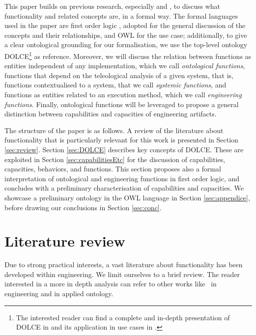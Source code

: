 \documentclass[sw]{iosart2x}
\newcommand{\DOLCE}{\textsc{DOLCE}\xspace} %
\newcommand{\OWL}{\textnormal{OWL}\xspace}
\newcommand{\firstTimeKeyWord}[1]{\textit{#1}}
\begin{document}
This paper builds on previous research, especially \cite{borgoCapabilitiesCapacitiesFunctionalities2021} and \cite{mizoguchiUnifyingDefinitionArtifact2016}, to discuss what functionality and related concepts are, in a formal way. 
The formal languages used in the paper are first order logic \cite{sep-logic-classical}, adopted for the general discussion of the concepts and their relationships, and \OWL \cite{OWL2-QUICK-REFERENCE} for the use case; additionally, to give a clear ontological grounding for our formalisation, we use the top-level ontology \DOLCE\footnote{The interested reader can find a complete and in-depth presentation of \DOLCE in \cite{masoloWonderWebDeliverableD182003} and its application in use cases in \cite{borgoDOLCEDescriptiveOntology2022}.} as reference. 
Moreover, we will discuss the relation between functions as entities independent of any implementation, which we call \firstTimeKeyWord{ontological functions}, functions that depend on the teleological analysis of a given system, that is, functions contextualised to a system, that we call \firstTimeKeyWord{systemic functions}, and functions as entities related to an execution method, which we call \firstTimeKeyWord{engineering functions}.
Finally, ontological functions will be leveraged to propose a general distinction between capabilities and capacities of engineering artifacts.   

The structure of the paper is as follows. A review of the literature about functionality that is particularly relevant for this work is presented in Section \ref{sec:review}. 
Section \ref{sec:DOLCE} describes key concepts of \DOLCE. These are exploited in Section \ref{sec:capabilitiesEtc} for the discussion of capabilities, capacities, behaviors, and functions. This section proposes also a formal interpretation of ontological and engineering functions in first order logic, and concludes with a preliminary characterisation of capabilities and capacities. We showcase a preliminary ontology in the \OWL language in Section \ref{sec:appendice}, before drawing our conclusions in Section \ref{sec:conc}. 

\section{Literature review\label{sec:review}}%
Due to strong practical interests, a vast literature about functionality has been developed within engineering. 
We limit ourselves to a brief review. The reader interested in a more in depth analysis can refer to other works like~\cite{erdenReviewFunctionModeling2008} in engineering and \cite{artigaNewPerspectiveOnFunctions} in applied ontology.
\end{document}
